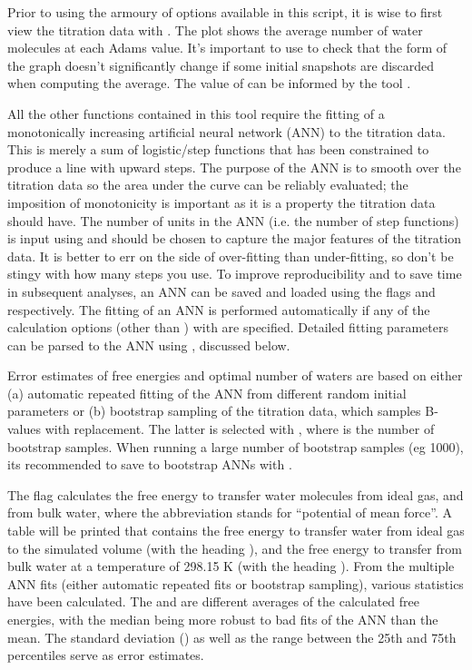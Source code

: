 \documentclass[letterpaper,10pt,english]{manual}
\begin{document}
Prior to using the armoury of options available in this script, it is wise to first view the titration data with . The plot shows the average number of water molecules at each Adams value. It's important to use  to check that the form of the graph doesn't significantly change if some initial snapshots are discarded when computing the average. The value of  can be informed by the tool .

All the other functions contained in this tool require the fitting of a monotonically increasing artificial neural network (ANN) to the titration data. This is merely a sum of logistic/step functions that has been constrained to produce a line with upward steps. The purpose of the ANN is to smooth over the titration data so the area under the curve can be reliably evaluated; the imposition of monotonicity is important as it is a property the titration data should have. The number of units in the ANN (i.e. the number of step functions) is input using  and should be chosen to capture the major features of the titration data. It is better to err on the side of over-fitting than under-fitting, so don't be stingy with how many steps you use. To improve reproducibility and to save time in subsequent analyses, an ANN can be saved and loaded using the flags  and  respectively. The fitting of an ANN is performed automatically if any of the calculation options (other than ) with  are specified. Detailed fitting parameters can be parsed to the ANN using , discussed below.

Error estimates of free energies and optimal number of waters are based on either (a) automatic repeated fitting of the ANN from different random initial parameters or (b) bootstrap sampling of the titration data, which samples B-values with replacement. The latter is selected with , where  is the number of bootstrap samples. When running a large number of bootstrap samples (eg 1000), its recommended to save to bootstrap ANNs with .

The flag  calculates the free energy to transfer water molecules from ideal gas, and from bulk water, where the abbreviation stands for “potential of mean force”. A table will be printed
that contains the free energy to transfer water from ideal gas to the simulated volume (with the heading ), and the free energy to transfer from bulk water at a temperature of 298.15 K (with the heading ). From the multiple ANN fits (either automatic repeated fits or bootstrap sampling), various statistics have been calculated. The  and  are different averages of the calculated free energies, with the median being more robust to bad fits of the ANN than the mean. The standard deviation () as well as the range between the 25th and 75th percentiles serve as error estimates.
\end{document}
